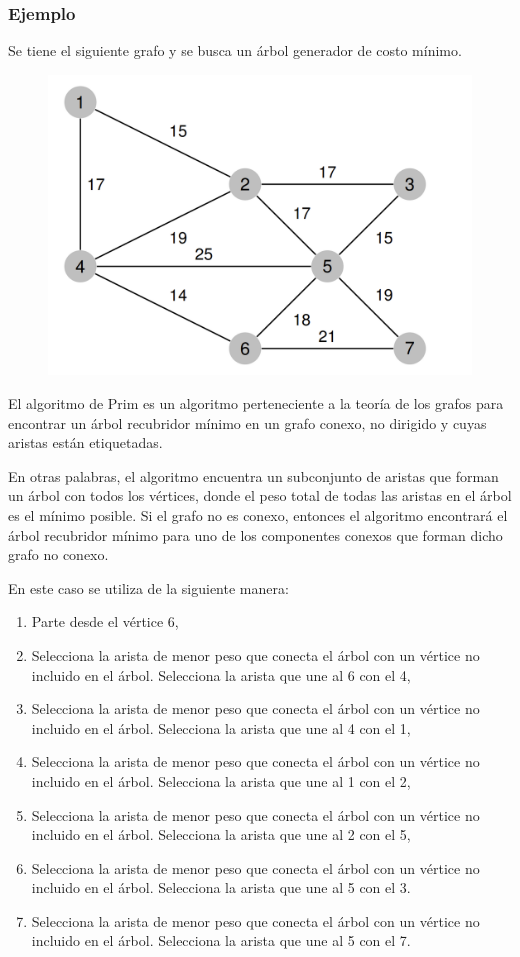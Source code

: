 \subsubsection{Ejemplo}
Se tiene el siguiente grafo y se busca un árbol generador de costo mínimo.
\begin{figure}[h]
    \centering
    \includegraphics[scale=0.5]{estáticos/figura6.png}
\end{figure}
El algoritmo de Prim es un algoritmo perteneciente a la teoría de los grafos para encontrar un árbol recubridor mínimo en un grafo conexo, no dirigido y cuyas aristas están etiquetadas.

En otras palabras, el algoritmo encuentra un subconjunto de aristas que forman un árbol con todos los vértices, donde el peso total de todas las aristas en el árbol es el mínimo posible. Si el grafo no es conexo, entonces el algoritmo encontrará el árbol recubridor mínimo para uno de los componentes conexos que forman dicho grafo no conexo.

En este caso se utiliza de la siguiente manera:
\begin{enumerate}
    \item Parte desde el vértice 6,
    \item Selecciona la arista de menor peso que conecta el árbol con un vértice no incluido en el árbol. Selecciona la arista que une al 6 con el 4,
    \item Selecciona la arista de menor peso que conecta el árbol con un vértice no incluido en el árbol. Selecciona la arista que une al 4 con el 1,
    \item  Selecciona la arista de menor peso que conecta el árbol con un vértice no incluido en el árbol. Selecciona la arista que une al 1 con el 2,
    \item  Selecciona la arista de menor peso que conecta el árbol con un vértice no incluido en el árbol. Selecciona la arista que une al 2 con el 5,
    \item  Selecciona la arista de menor peso que conecta el árbol con un vértice no incluido en el árbol. Selecciona la arista que une al 5 con el 3.
    \item  Selecciona la arista de menor peso que conecta el árbol con un vértice no incluido en el árbol. Selecciona la arista que une al 5 con el 7.
\end{enumerate}

